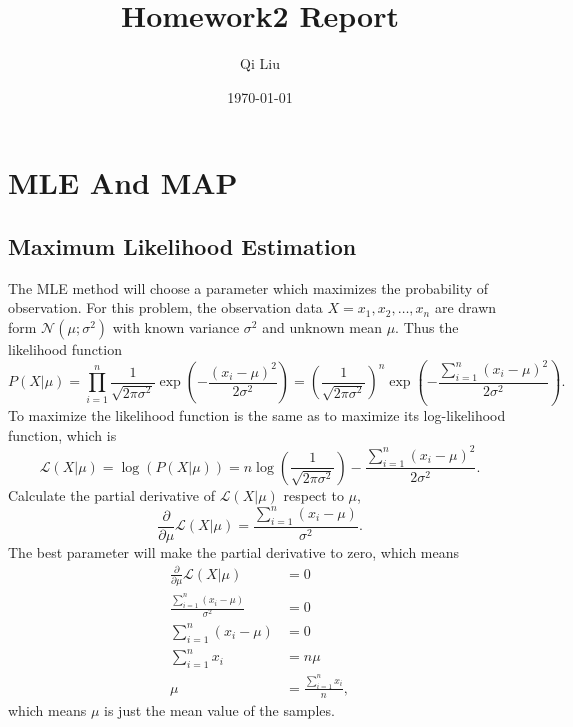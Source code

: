 \documentclass{article}
\title{Homework2 Report}
\author{Qi Liu}
\date{\today}
\begin{document}
	
\maketitle

\section{MLE And MAP}

\subsection{Maximum	Likelihood Estimation}
The MLE method will choose a parameter which maximizes the probability of observation. For this problem, the observation data $X=x_1,x_2,\ldots,x_n$ are drawn form $\mathcal{N}(\mu;\sigma^2)$ with known variance $\sigma^2$ and unknown mean $\mu$. Thus the likelihood function $$P(X|\mu)=\prod_{i=1}^n\frac{1}{\sqrt{2\pi\sigma^2}} \exp(-\frac{(x_i-\mu)^2}{2\sigma^2})= (\frac{1}{\sqrt{2\pi\sigma^2}})^n \exp(-\frac{\sum_{i=1}^n(x_i-\mu)^2}{2\sigma^2}).$$ To maximize the likelihood function is the same as to maximize its log-likelihood function, which is $$\mathcal{L}(X|\mu)=\log(P(X|\mu)) =n\log(\frac{1}{\sqrt{2\pi\sigma^2}}) -\frac{\sum_{i=1}^n(x_i-\mu)^2}{2\sigma^2}.$$ Calculate the partial derivative of $\mathcal{L}(X|\mu)$ respect to $\mu$, $$\frac{\partial}{\partial\mu}\mathcal{L}(X|\mu)= \frac{\sum_{i=1}^n(x_i-\mu)}{\sigma^2}.$$ The best parameter will make the partial derivative to zero, which means
\begin{align*}
\frac{\partial}{\partial\mu}\mathcal{L}(X|\mu)&=0 \\
\frac{\sum_{i=1}^n(x_i-\mu)}{\sigma^2}&=0 \\
\sum_{i=1}^n(x_i-\mu)&=0 \\
\sum_{i=1}^nx_i&=n\mu \\
\mu&=\frac{\sum_{i=1}^nx_i}{n},
\end{align*}
which means $\mu$ is just the mean value of the samples.
\end{document}
